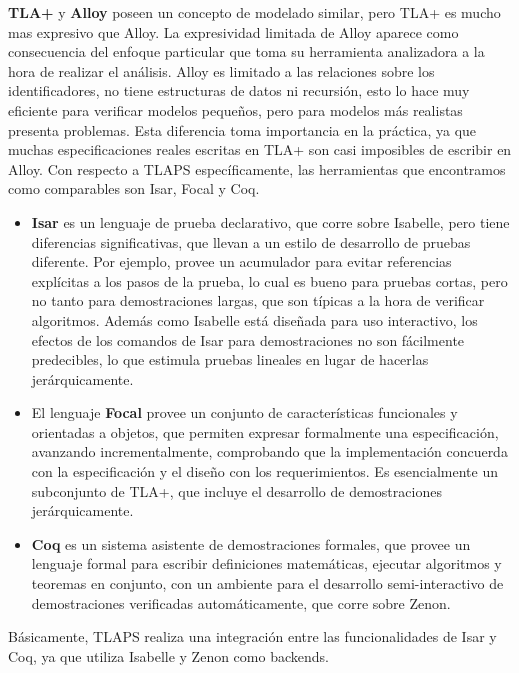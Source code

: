 \documentclass[spanish]{llncs}
\begin{document}
\textbf{TLA+} y \textbf{Alloy} poseen un concepto de modelado similar, pero TLA+ es mucho mas expresivo que Alloy. La expresividad limitada de Alloy aparece como consecuencia del enfoque particular que toma su herramienta analizadora a la hora de realizar el análisis. Alloy es limitado a las relaciones sobre los identificadores, no tiene estructuras de datos ni recursión, esto lo hace muy eficiente para verificar modelos pequeños, pero para modelos más realistas presenta problemas. 
Esta diferencia toma importancia en la práctica, ya que muchas especificaciones reales escritas en TLA+ son 
casi imposibles de escribir en Alloy.
Con respecto a TLAPS específicamente, las herramientas que encontramos como comparables son Isar, Focal y Coq.
    \begin{itemize}
      \item 
      \textbf{Isar} es un lenguaje de prueba declarativo, que corre sobre Isabelle, pero tiene diferencias significativas, que llevan a un estilo de desarrollo de pruebas diferente. Por ejemplo, provee un acumulador para evitar referencias explícitas a los pasos de la prueba, lo cual es bueno para pruebas cortas, pero no tanto para demostraciones largas, que son típicas a la hora de verificar algoritmos. Además como Isabelle está diseñada para uso interactivo, los efectos de los comandos de Isar para demostraciones no son fácilmente 
      predecibles, lo que estimula pruebas lineales en lugar de hacerlas jerárquicamente. 

      \item
      El lenguaje \textbf{Focal} provee un conjunto de características funcionales y orientadas a objetos, que permiten expresar formalmente una especificación, avanzando incrementalmente, comprobando que la implementación concuerda con la especificación y el diseño con los requerimientos. Es esencialmente un subconjunto de TLA+, que incluye el desarrollo de demostraciones jerárquicamente.

      \item
      \textbf{Coq} es un sistema asistente de demostraciones formales, que provee un lenguaje formal para escribir definiciones matemáticas, ejecutar algoritmos y teoremas en conjunto, con un ambiente para el desarrollo semi-interactivo de demostraciones verificadas automáticamente, que corre sobre Zenon.

    \end{itemize}
  
  Básicamente, TLAPS realiza una integración entre las funcionalidades de  Isar y Coq, ya que utiliza Isabelle y Zenon como backends.
\end{document}
